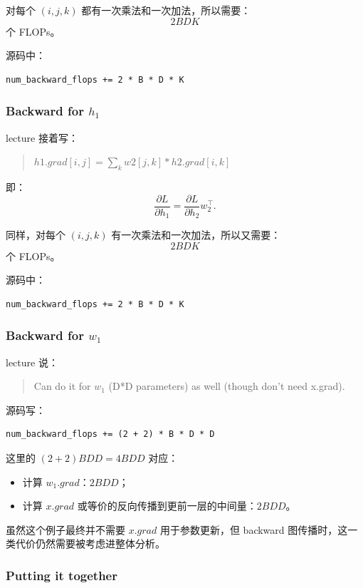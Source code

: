 \documentclass[a4paper,UTF8]{article}
\numberwithin{equation}{section}
\begin{document}
对每个 \((i,j,k)\) 都有一次乘法和一次加法，所以需要：
\[
2BDK
\]
个 FLOPs。

源码中：
\begin{verbatim}
num_backward_flops += 2 * B * D * K
\end{verbatim}

\subsubsection{Backward for \(h_1\)}

lecture 接着写：
\begin{quote}
\(h1.grad[i,j] = \sum_k w2[j,k] * h2.grad[i,k]\)
\end{quote}

即：
\[
\frac{\partial L}{\partial h_1}
=
\frac{\partial L}{\partial h_2} w_2^\top.
\]

同样，对每个 \((i,j,k)\) 有一次乘法和一次加法，所以又需要：
\[
2BDK
\]
个 FLOPs。

源码中：
\begin{verbatim}
num_backward_flops += 2 * B * D * K
\end{verbatim}

\subsubsection{Backward for \(w_1\)}

lecture 说：
\begin{quote}
Can do it for \(w_1\) (D*D parameters) as well (though don't need x.grad).
\end{quote}

源码写：
\begin{verbatim}
num_backward_flops += (2 + 2) * B * D * D
\end{verbatim}

这里的 \((2+2)BDD = 4BDD\) 对应：
\begin{itemize}
    \item 计算 \(w_1.grad\)：\(2BDD\)；
    \item 计算 \(x.grad\) 或等价的反向传播到更前一层的中间量：\(2BDD\)。
\end{itemize}

虽然这个例子最终并不需要 \(x.grad\) 用于参数更新，但 backward 图传播时，这一类代价仍然需要被考虑进整体分析。

\subsubsection{Putting it together}
\end{document}

